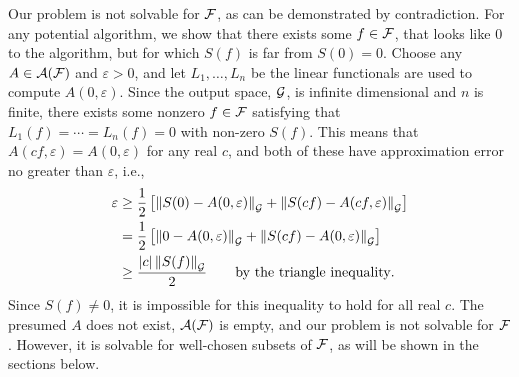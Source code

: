 \documentclass[final]{elsarticle}
\theoremstyle{definition}
\theoremstyle{remark}
\begin{document}
Our problem is not solvable for $\cf$, as can be demonstrated by contradiction. For any potential algorithm, we show that there exists some $f \in \cf$, that looks like $0$ to the algorithm, but for which $S(f)$ is far from $S(0) = 0$.   Choose any $A \in \ca(\cf)$ and $\varepsilon > 0$, and let $L_1, \ldots, L_n$ be the linear functionals are used to compute $A(0,\varepsilon)$. Since the output space, $\cg$, is infinite dimensional and $n$ is finite, there exists some nonzero $f \in \cf$ satisfying that $L_1(f) = \cdots = L_n(f) = 0$ with non-zero $S(f)$. This means that $A(cf,\varepsilon) = A(0,\varepsilon)$ for any real $c$, and both of these have approximation error no greater than $\varepsilon$, i.e.,
\begin{align*}
    \varepsilon &\ge \frac 12 \left[ \norm[\cg]{S(0) - A(0,\varepsilon)} + \norm[\cg]{S(cf) - A(cf,\varepsilon)}\right] \\
    & =  \frac 12 \left[ \norm[\cg]{0 - A(0,\varepsilon)} + \norm[\cg]{S(cf) - A(0,\varepsilon)}\right] \\
    & \ge  \frac {\abs{c}\norm[\cg]{S(f)}}2  \qquad \text{by the triangle inequality}.
\end{align*}
Since $S(f) \ne 0$, it is impossible for this inequality to hold for all real $c$.  The presumed $A$ does not exist, $\ca(\cf)$ is empty, and our problem is not solvable for $\cf$. However, it is solvable for well-chosen subsets of $\cf$, as will be shown in the sections below.
\end{document}
